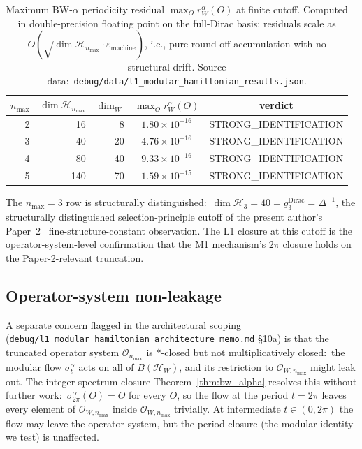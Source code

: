 \documentclass[11pt,a4paper]{article}
\theoremstyle{plain}
\theoremstyle{definition}
\newcommand{\nmax}{n_{\max}}
\newcommand{\Hilb}{\mathcal{H}}
\newcommand{\Op}{\mathcal{O}}
\begin{document}
\begin{table}[ht]
\centering
\caption{Maximum BW-$\alpha$ periodicity residual
$\max_O r_W^{\alpha}(O)$ at finite cutoff. Computed in
double-precision floating point on the full-Dirac basis;
residuals scale as
$O(\sqrt{\dim \Hilb_{\nmax}} \cdot \varepsilon_{\mathrm{machine}})$,
i.e., pure round-off accumulation with no structural drift. Source
data:\ \texttt{debug/data/l1\_modular\_hamiltonian\_results.json}.}
\label{tab:bw_alpha_residuals}
\begin{tabular}{rrrcc}
\toprule
$\nmax$ & $\dim \Hilb_{\nmax}$ & $\dim_W$ &
$\max_O r_W^{\alpha}(O)$ &
verdict\\
\midrule
2 & 16  & 8  & $1.80 \times 10^{-16}$ & STRONG\_IDENTIFICATION \\
3 & 40  & 20 & $4.76 \times 10^{-16}$ & STRONG\_IDENTIFICATION \\
4 & 80  & 40 & $9.33 \times 10^{-16}$ & STRONG\_IDENTIFICATION \\
5 & 140 & 70 & $1.59 \times 10^{-15}$ & STRONG\_IDENTIFICATION \\
\bottomrule
\end{tabular}
\end{table}

The $\nmax = 3$ row is structurally distinguished:\ $\dim \Hilb_3 = 40
= g_3^{\mathrm{Dirac}} = \Delta^{-1}$, the structurally distinguished
selection-principle cutoff of the present author's
Paper~2~\cite{paper2} fine-structure-constant observation. The L1
closure at this cutoff is the operator-system-level confirmation that
the M1 mechanism's $2\pi$ closure holds on the Paper-2-relevant
truncation.

\subsection{Operator-system non-leakage}\label{sec:os_leakage}

A separate concern flagged in the architectural scoping
(\texttt{debug/l1\_modular\_hamiltonian\_architecture\_memo.md}
\S 10a) is that the truncated operator system $\Op_{\nmax}$ is
$*$-closed but not multiplicatively closed:\ the modular flow
$\sigma_t^{\alpha}$ acts on all of $B(\Hilb_W)$, and its restriction
to $\Op_{W, \nmax}$ might leak out. The integer-spectrum closure
Theorem~\ref{thm:bw_alpha} resolves this without further work:\
$\sigma_{2\pi}^{\alpha}(O) = O$ for every $O$, so the flow at the
period $t = 2\pi$ leaves every element of $\Op_{W, \nmax}$ inside
$\Op_{W, \nmax}$ trivially. At intermediate $t \in (0, 2\pi)$ the flow
may leave the operator system, but the period closure (the modular
identity we test) is unaffected.
\end{document}
